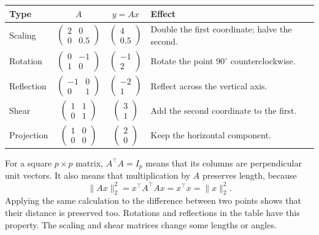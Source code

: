 \begin{center}
\begin{tabularx}{\linewidth}{@{}lccX@{}}
\toprule
\textbf{Type} & $A$ & $y=Ax$ & \textbf{Effect} \\
\midrule
Scaling & $\begin{pmatrix}2&0\\0&0.5\end{pmatrix}$
  & $\begin{pmatrix}4\\0.5\end{pmatrix}$
  & Double the first coordinate; halve the second. \\[9pt]
Rotation & $\begin{pmatrix}0&-1\\1&0\end{pmatrix}$
  & $\begin{pmatrix}-1\\2\end{pmatrix}$
  & Rotate the point $90^\circ$ counterclockwise. \\[9pt]
Reflection & $\begin{pmatrix}-1&0\\0&1\end{pmatrix}$
  & $\begin{pmatrix}-2\\1\end{pmatrix}$
  & Reflect across the vertical axis. \\[9pt]
Shear & $\begin{pmatrix}1&1\\0&1\end{pmatrix}$
  & $\begin{pmatrix}3\\1\end{pmatrix}$
  & Add the second coordinate to the first. \\[9pt]
Projection & $\begin{pmatrix}1&0\\0&0\end{pmatrix}$
  & $\begin{pmatrix}2\\0\end{pmatrix}$
  & Keep the horizontal component. \\
\bottomrule
\end{tabularx}
\end{center}

For a square $p\times p$ matrix, $A^\top A=I_p$ means that its columns
are perpendicular unit vectors. It also means that multiplication by
$A$ preserves length, because
\[
  \lVert Ax\rVert_2^2
   =x^\top A^\top Ax=x^\top x=\lVert x\rVert_2^2.
\]
Applying the same calculation to the difference between two points
shows that their distance is preserved too. Rotations and reflections
in the table have this property. The scaling and shear matrices
change some lengths or angles.

